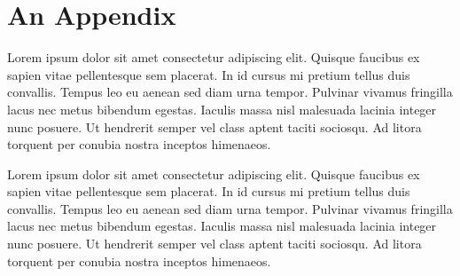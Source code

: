 \section{An Appendix}

Lorem ipsum dolor sit amet consectetur adipiscing elit. Quisque faucibus ex sapien vitae pellentesque sem placerat. In id cursus mi pretium tellus duis convallis. Tempus leo eu aenean sed diam urna tempor. Pulvinar vivamus fringilla lacus nec metus bibendum egestas. Iaculis massa nisl malesuada lacinia integer nunc posuere. Ut hendrerit semper vel class aptent taciti sociosqu. Ad litora torquent per conubia nostra inceptos himenaeos.

Lorem ipsum dolor sit amet consectetur adipiscing elit. Quisque faucibus ex sapien vitae pellentesque sem placerat. In id cursus mi pretium tellus duis convallis. Tempus leo eu aenean sed diam urna tempor. Pulvinar vivamus fringilla lacus nec metus bibendum egestas. Iaculis massa nisl malesuada lacinia integer nunc posuere. Ut hendrerit semper vel class aptent taciti sociosqu. Ad litora torquent per conubia nostra inceptos himenaeos.